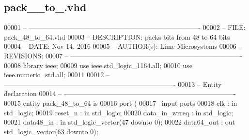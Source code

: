 \subsection{pack\+\_\+\_\+to\+\_.\+vhd}
\label{rx__path__top_2bit__pack_2synth_2pack__48__to__64_8vhd_source}

\begin{DoxyCode}
00001 \textcolor{keyword}{-- ----------------------------------------------------------------------------    }
00002 \textcolor{keyword}{-- FILE:     pack\_48\_to\_64.vhd}
00003 \textcolor{keyword}{-- DESCRIPTION:    packs bits from 48 to 64 bits}
00004 \textcolor{keyword}{-- DATE:    Nov 14, 2016}
00005 \textcolor{keyword}{-- AUTHOR(s):    Lime Microsystems}
00006 \textcolor{keyword}{-- REVISIONS:}
00007 \textcolor{keyword}{-- ----------------------------------------------------------------------------    }
00008 \textcolor{vhdlkeyword}{library }\textcolor{keywordflow}{ieee};
00009 \textcolor{vhdlkeyword}{use }ieee.std\_logic\_1164.\textcolor{keywordflow}{all};
00010 \textcolor{vhdlkeyword}{use }ieee.numeric\_std.\textcolor{keywordflow}{all};
00011 
00012 \textcolor{keyword}{-- ----------------------------------------------------------------------------}
00013 \textcolor{keyword}{-- Entity declaration}
00014 \textcolor{keyword}{-- ----------------------------------------------------------------------------}
00015 \textcolor{keywordflow}{entity }pack_48_to_64 \textcolor{keywordflow}{is}
00016   \textcolor{keywordflow}{port} \textcolor{vhdlchar}{(}
00017 \textcolor{keyword}{      --input ports }
00018       \textcolor{vhdlchar}{clk}            \textcolor{vhdlchar}{:} \textcolor{keywordflow}{in} \textcolor{comment}{std\_logic};
00019       \textcolor{vhdlchar}{reset_n}        \textcolor{vhdlchar}{:} \textcolor{keywordflow}{in} \textcolor{comment}{std\_logic};
00020       \textcolor{vhdlchar}{data_in_wrreq}  \textcolor{vhdlchar}{:} \textcolor{keywordflow}{in} \textcolor{comment}{std\_logic};
00021       \textcolor{vhdlchar}{data48_in}      \textcolor{vhdlchar}{:} \textcolor{keywordflow}{in} \textcolor{comment}{std\_logic\_vector}\textcolor{vhdlchar}{(}\textcolor{vhdllogic}{}\textcolor{vhdllogic}{47} \textcolor{keywordflow}{downto} \textcolor{vhdllogic}{}\textcolor{vhdllogic}{0}\textcolor{vhdlchar}{)};
00022       \textcolor{vhdlchar}{data64_out}     \textcolor{vhdlchar}{:} \textcolor{keywordflow}{out} \textcolor{comment}{std\_logic\_vector}\textcolor{vhdlchar}{(}\textcolor{vhdllogic}{}\textcolor{vhdllogic}{63} \textcolor{keywordflow}{downto} \textcolor{vhdllogic}{}\textcolor{vhdllogic}{0}\textcolor{vhdlchar}{)};

\end{DoxyCode}
